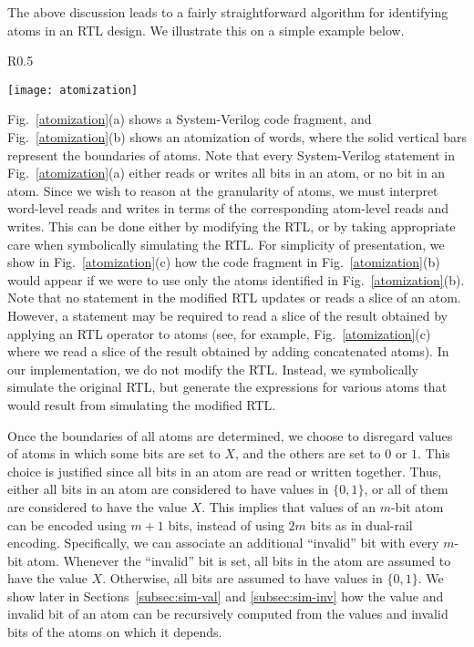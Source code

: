 \documentclass{llncs}
\begin{document}
The above discussion leads to a fairly straightforward algorithm for
identifying atoms in an RTL design.  We illustrate this on a simple example below.
\begin{wrapfigure}[16]{R}{0.5\textwidth}
\vspace*{-0.4in}
\begin{center}
\texttt{[image: atomization]}
\end{center}
\vspace*{-0.2in}
\caption{\label{atomization}Illustrating atomization}
\end{wrapfigure}
Fig.~\ref{atomization}(a) shows a System-Verilog code fragment, and
Fig.~\ref{atomization}(b) shows an atomization of words, where the
solid vertical bars represent the boundaries of atoms.  Note that
every System-Verilog statement in Fig.~\ref{atomization}(a) either
reads or writes all bits in an atom, or no bit in an atom.  Since we
wish to reason at the granularity of atoms, we must interpret
word-level reads and writes in terms of the corresponding atom-level
reads and writes.  This can be done either by modifying the RTL, or by
taking appropriate care when symbolically simulating the RTL.  For
simplicity of presentation, we show in Fig.~\ref{atomization}(c) how
the code fragment in Fig.~\ref{atomization}(b) would appear if we were
to use only the atoms identified in Fig.~\ref{atomization}(b).  Note
that no statement in the modified RTL updates or reads a slice of an
atom.  However, a statement may be required to read a slice of the
result obtained by applying an RTL operator to atoms (see, for example,
Fig.~\ref{atomization}(c) where we read a slice of the result obtained by
adding concatenated atoms). In our implementation, we do not modify the RTL.
Instead, we symbolically simulate the original RTL, but generate the
expressions for various atoms that would result from simulating the
modified RTL.

Once the boundaries of all atoms are determined, we choose to
disregard values of atoms in which some bits are set to $X$, and the
others are set to $0$ or $1$.  This choice is justified since all bits
in an atom are  read or written together.  Thus, either all bits
in an atom are considered to have values in $\{0, 1\}$, or all of them
are considered to have the value $X$.  This implies that values of an
$m$-bit atom can be encoded using $m+1$ bits, instead of using $2m$
bits as in dual-rail encoding.  Specifically, we can associate an
additional ``invalid'' bit with every $m$-bit atom.  Whenever the
``invalid'' bit is set, all bits in the atom are assumed to have the
value $X$.  Otherwise, all bits are assumed to have values in $\{0,
1\}$.  We show later in Sections~\ref{subsec:sim-val} and
\ref{subsec:sim-inv} how the value and invalid bit of an atom can be
recursively computed from the values and invalid bits of the atoms on
which it depends.
\end{document}

